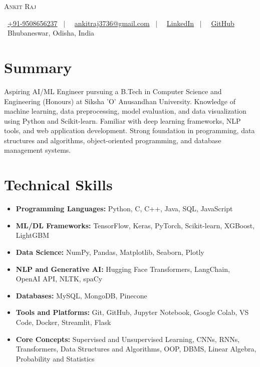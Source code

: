 \documentclass[letterpaper,10pt]{article}
\begin{document}
\begin{center}
    {\Huge \scshape Ankit Raj} \\ \vspace{4pt}

    \small
    \faPhone\ \href{tel:+919508656237}{+91-9508656237}
    \ $|$ \
    \faEnvelope\ \href{mailto:ankitraj3736@gmail.com}
    {ankitraj3736@gmail.com}
    \ $|$ \
    \faLinkedin\ \href{https://www.linkedin.com/in/ankit-raj-319201307/}
    {LinkedIn}
    \ $|$ \
    \faGithub\ \href{https://github.com/ankitraj36}
    {GitHub}
    \\[3pt]
    \faMapMarker*\ Bhubaneswar, Odisha, India
\end{center}

\section{Summary}

\small{
Aspiring AI/ML Engineer pursuing a B.Tech in Computer Science
and Engineering (Honours) at Siksha 'O' Anusandhan University.
Knowledge of machine learning, data preprocessing, model
evaluation, and data visualization using Python and Scikit-learn.
Familiar with deep learning frameworks, NLP tools, and web
application development. Strong foundation in programming,
data structures and algorithms, object-oriented programming,
and database management systems.
}

\section{Technical Skills}

\begin{itemize}[leftmargin=0.15in,label={},itemsep=1pt,topsep=2pt]
\small
    \item \textbf{Programming Languages:}
    Python, C, C++, Java, SQL, JavaScript

    \item \textbf{ML/DL Frameworks:}
    TensorFlow, Keras, PyTorch, Scikit-learn, XGBoost, LightGBM

    \item \textbf{Data Science:}
    NumPy, Pandas, Matplotlib, Seaborn, Plotly

    \item \textbf{NLP and Generative AI:}
    Hugging Face Transformers, LangChain, OpenAI API,
    NLTK, spaCy

    \item \textbf{Databases:}
    MySQL, MongoDB, Pinecone

    \item \textbf{Tools and Platforms:}
    Git, GitHub, Jupyter Notebook, Google Colab, VS Code,
    Docker, Streamlit, Flask

    \item \textbf{Core Concepts:}
    Supervised and Unsupervised Learning, CNNs, RNNs,
    Transformers, Data Structures and Algorithms, OOP,
    DBMS, Linear Algebra, Probability and Statistics
\end{itemize}
\end{document}
